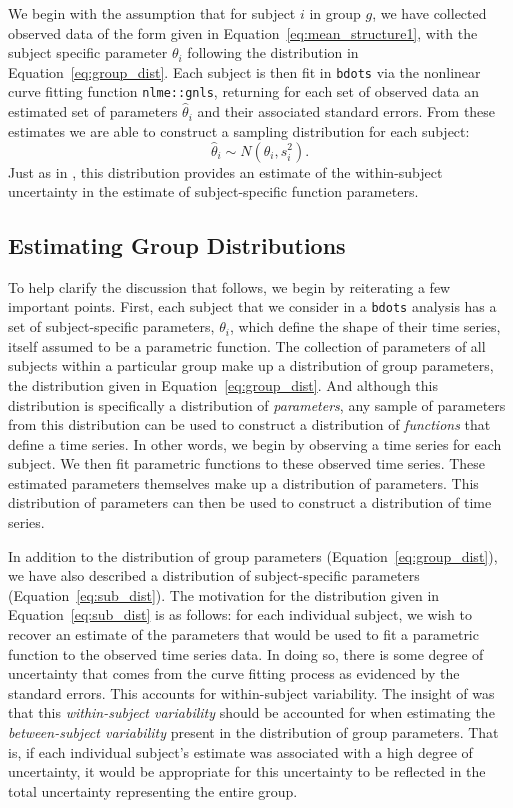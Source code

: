 \documentclass{article}
\newcommand{\xt}{\texttt}%
\begin{document}
We begin with the assumption that for subject $i$ in group $g$, we have collected observed data of the form given in Equation~\ref{eq:mean_structure1}, with the subject specific parameter $\theta_i$ following the distribution in Equation~\ref{eq:group_dist}. Each subject is then fit in \xt{bdots} via the nonlinear curve fitting function \xt{nlme::gnls}, returning for each set of observed data an estimated set of parameters $\hat{\theta}_i$ and their associated standard errors. From these estimates we are able to construct a sampling distribution for each subject:
\begin{equation}\label{eq:sub_dist}
\hat{\theta}_i \sim N(\theta_i, s_i^2).
\end{equation}
Just as in \citet{oleson2017detecting}, this distribution provides an estimate of the within-subject uncertainty in the estimate of subject-specific function parameters.




\subsection{Estimating Group Distributions}\label{sec:group_dist}

To help clarify the discussion that follows, we begin by reiterating a few important points. First, each subject that we consider in a \xt{bdots} analysis has a set of subject-specific parameters, $\theta_i$, which define the shape of their time series, itself assumed to be a parametric function. The collection of parameters of all subjects within a particular group make up a distribution of group parameters, the distribution given in Equation~\ref{eq:group_dist}. And although this distribution is specifically a distribution of \textit{parameters}, any sample of parameters from this distribution can be used to  construct a distribution of \textit{functions} that define a time series. In other words, we begin by observing a time series for each subject. We then fit parametric functions to these observed time series. These estimated parameters themselves make up a distribution of parameters. This distribution of parameters can then be used to construct a distribution of time series. 

In addition to the distribution of group parameters (Equation~\ref{eq:group_dist}), we have also described a distribution of subject-specific parameters (Equation~\ref{eq:sub_dist}). The motivation for the distribution given in Equation~\ref{eq:sub_dist} is as follows: for each individual subject, we wish to recover an estimate of the parameters that would be used to fit a parametric function to the observed time series data. In doing so, there is some degree of uncertainty that comes from the curve fitting process as evidenced by the standard errors. This accounts for within-subject variability. The insight of \citet{oleson2017detecting} was that this \textit{within-subject variability} should be accounted for when estimating the \textit{between-subject variability} present in the distribution of group parameters. That is, if each individual subject's estimate was associated with a high degree of uncertainty, it would be appropriate for this uncertainty to be reflected in the total uncertainty representing the entire group.
\end{document}
